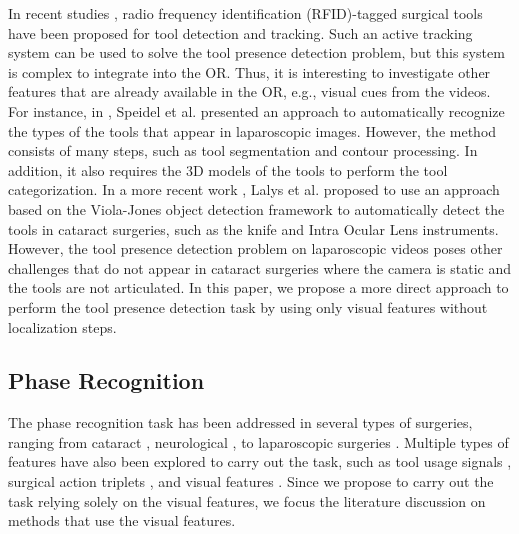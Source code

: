 \documentclass[journal]{IEEEtran} \usepackage{amssymb}
\begin{document}
In recent studies \cite{kranzfelder_sr2013,neumuth_ijcars2012}, radio frequency
identification (RFID)-tagged surgical tools have been proposed for
tool detection and tracking. Such an active tracking system can be
used to solve the tool presence detection problem, but this system
is complex to integrate into the OR. Thus,
it is interesting to investigate other features that are already available
in the OR, e.g., visual cues from the videos. For instance, in \cite{speidel_spie2009}, Speidel et al. presented an approach
to automatically recognize the types of the tools that appear in laparoscopic
images. However, the method consists of many steps, such
as tool segmentation and contour processing. In addition, it also
requires the 3D models of the tools to perform the tool categorization.
In a more recent work \cite{lalys_tbme2012}, Lalys et al. proposed
to use an approach based on the Viola-Jones object detection framework
to automatically detect the tools in cataract surgeries, such as the knife
and Intra Ocular Lens instruments. However, the tool presence detection
problem on laparoscopic videos poses other challenges that do not
appear in cataract surgeries where the camera is static and the tools
are not articulated. In this paper, we propose
a more direct approach to perform the tool presence detection task by
using only visual features without localization steps. 


\subsection{Phase Recognition}

The phase recognition task has been addressed in several types of
surgeries, ranging from cataract \cite{lalys_tbme2012,quellec_tmi2015},
neurological \cite{forestier_bmi2013}, to laparoscopic
surgeries \cite{katic_ipcai2014,blum_miccai2010,lo_miccai2003}.
Multiple types of features have also been explored to carry out the
task, such as tool usage signals \cite{padoy_mia2012,forestier_bmi2013},
surgical action triplets \cite{forestier_ijcars2015,katic_ipcai2014},
and visual features \cite{blum_miccai2010,lea_amia2013}. Since
we propose to carry out the task relying solely on the visual features,
we focus the literature discussion on methods that use the visual features. 
\end{document}
